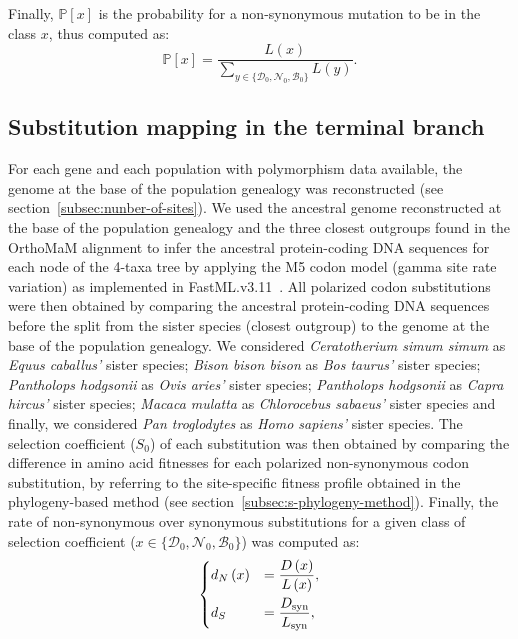 \documentclass[12pt]{article}
\newcommand{\proba}{\mathbb{P}}
\newcommand{\dn}{d_N}
\newcommand{\ds}{d_S}
\newcommand{\Sphy}{S_{0}}
\newcommand{\SphyDel}{\mathcal{D}_0}
\newcommand{\SphyNeu}{\mathcal{N}_0}
\newcommand{\SphyBen}{\mathcal{B}_0}
\newcommand{\Sphyclass}{x}
\newcommand{\SphyclassAlt}{y}
\begin{document}
    Finally, $\proba [ \Sphyclass ]$ is the probability for a non-synonymous mutation to be in the class $\Sphyclass$, thus computed as:
    \begin{equation}
        \proba[\Sphyclass] = \frac{L\left( \Sphyclass \right)}{\sum_{\SphyclassAlt\in \{\SphyDel, \SphyNeu, \SphyBen \} } L\left(\SphyclassAlt \right)}.
        \label{eq:proba-dfe-mutsel}
    \end{equation}

    \subsection{Substitution mapping in the terminal branch}
    \label{subsec:substitution-mapping-in-the-terminal-branch}
    For each gene and each population with polymorphism data available, the genome at the base of the population genealogy was reconstructed (see section~\ref{subsec:nunber-of-sites}).
    We used the ancestral genome reconstructed at the base of the population genealogy and the three closest outgroups found in the OrthoMaM alignment to infer the ancestral protein-coding DNA sequences for each node of the 4-taxa tree by applying the M5 codon model (gamma site rate variation) as implemented in FastML.v3.11~\cite{ashkenazy_fastml_2012}.
    All polarized codon substitutions were then obtained by comparing the ancestral protein-coding DNA sequences before the split from the sister species (closest outgroup) to the genome at the base of the population genealogy.
    We considered \textit{Ceratotherium simum simum} as \textit{Equus caballus'} sister species; \textit{Bison bison bison} as \textit{Bos taurus'} sister species; \textit{Pantholops hodgsonii} as \textit{Ovis aries'} sister species; \textit{Pantholops hodgsonii} as \textit{Capra hircus'} sister species; \textit{Macaca mulatta} as \textit{Chlorocebus sabaeus'} sister species and finally, we considered \textit{Pan troglodytes} as \textit{Homo sapiens'} sister species.
    The selection coefficient ($\Sphy$) of each substitution was then obtained by comparing the difference in amino acid fitnesses for each polarized non-synonymous codon substitution, by referring to the site-specific fitness profile obtained in the phylogeny-based method (see section~\ref{subsec:s-phylogeny-method}).
    Finally, the rate of non-synonymous over synonymous substitutions for a given class of selection coefficient ($\Sphyclass \in \{\SphyDel, \SphyNeu, \SphyBen \}$) was computed as:
    \begin{align}
        \begin{dcases}
            \dn \left( \Sphyclass \right) &= \dfrac{D\left( \Sphyclass \right)}{L \left( \Sphyclass \right)}, \\
            \ds &= \dfrac{D_{\text{syn}}}{L_{\text{syn}}},
        \end{dcases}\label{eq:dnds}
    \end{align}
\end{document}
